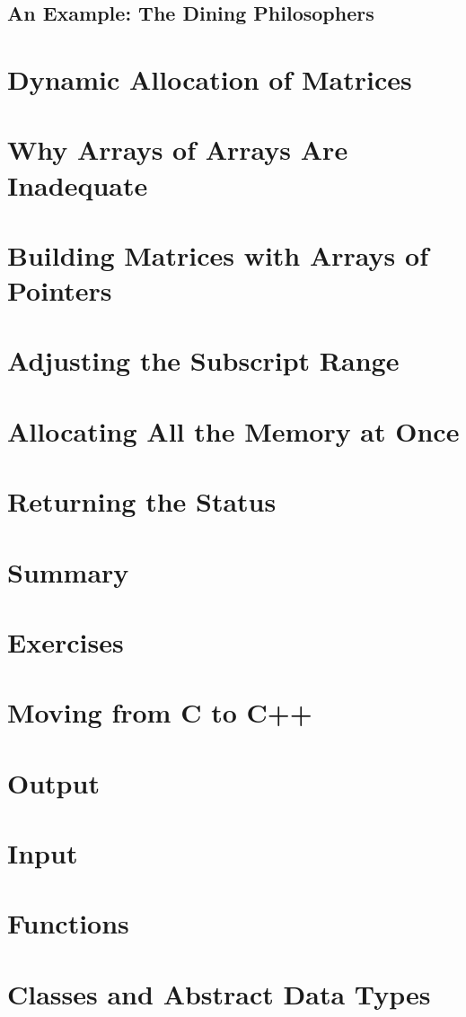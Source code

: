 \documentclass{article}
\begin{document}
\subsection{An Example: The Dining Philosophers}
\section{Dynamic Allocation of Matrices}
\section{Why Arrays of Arrays Are Inadequate}
\section{Building Matrices with Arrays of Pointers}
\section{Adjusting the Subscript Range}
\section{Allocating All the Memory at Once}
\section{Returning the Status}
\section{Summary}
\section{Exercises}

\section{Moving from C to C++}

\section{Output}
\section{Input}
\section{Functions}
\section{Classes and Abstract Data Types}
\end{document}
